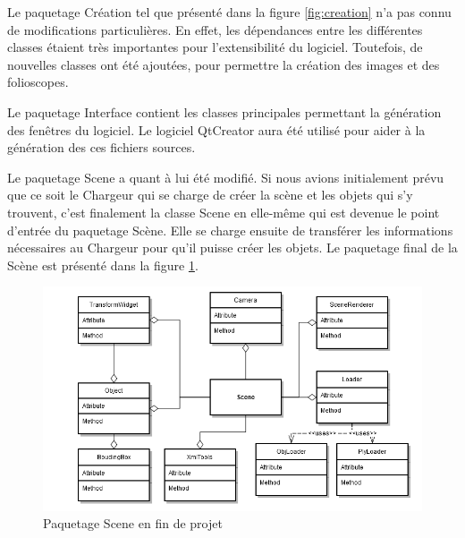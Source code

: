 Le paquetage Création tel que présenté dans la figure \ref{fig:creation} n'a pas connu de modifications particulières. En effet, les dépendances entre les différentes classes étaient très importantes pour l'extensibilité du logiciel. Toutefois, de nouvelles classes ont été ajoutées, pour permettre la création des images et des folioscopes.



Le paquetage Interface contient les classes principales permettant la génération des fenêtres du logiciel. Le logiciel QtCreator aura été utilisé pour aider à la génération des ces fichiers sources.

Le paquetage Scene a quant à lui été modifié. Si nous avions initialement prévu que ce soit le Chargeur qui se charge de créer la scène et les objets qui s'y trouvent, c'est finalement la classe Scene en elle-même qui est devenue le point d'entrée du paquetage Scène. Elle se charge ensuite de transférer les informations nécessaires au Chargeur pour qu'il puisse créer les objets. Le paquetage final de la Scène est présenté dans la figure \ref{fig:scene}.

\begin{figure}[h]
		\centering
                \includegraphics[scale=0.4]{f_scene.png}
		\caption{\label{fig:scene} Paquetage Scene en fin de projet \protect \footnotemark}
\end{figure}
